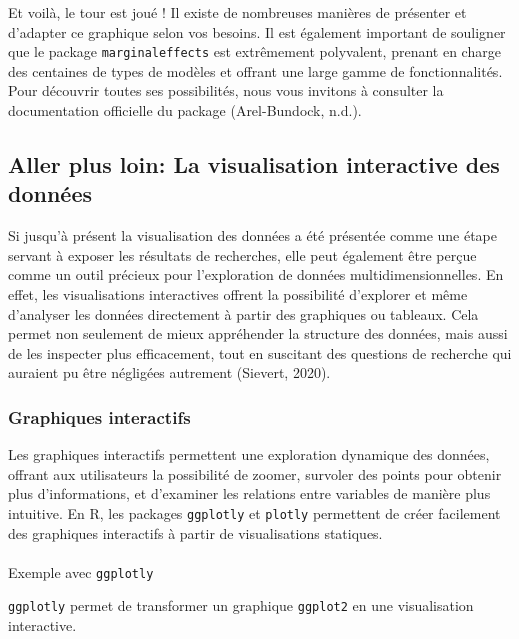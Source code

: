 \documentclass[
  letterpaper,
  DIV=11,
  numbers=noendperiod]{scrreprt}
\makeatletter
\let\oldparagraph\paragraph
\renewcommand{\paragraph}{
    \@ifstar
      \xxxParagraphStar
      \xxxParagraphNoStar
  }
\newcommand{\xxxParagraphStar}[1]{\oldparagraph*{#1}\mbox{}}
\newcommand{\xxxParagraphNoStar}[1]{\oldparagraph{#1}\mbox{}}
\makeatother
\begin{document}
Et voilà, le tour est joué ! Il existe de nombreuses manières de
présenter et d'adapter ce graphique selon vos besoins. Il est également
important de souligner que le package \texttt{marginaleffects} est
extrêmement polyvalent, prenant en charge des centaines de types de
modèles et offrant une large gamme de fonctionnalités. Pour découvrir
toutes ses possibilités, nous vous invitons à consulter la documentation
officielle du package (Arel-Bundock, n.d.).

\subsection{Aller plus loin: La visualisation interactive des
données}\label{aller-plus-loin-la-visualisation-interactive-des-donnuxe9es}

Si jusqu'à présent la visualisation des données a été présentée comme
une étape servant à exposer les résultats de recherches, elle peut
également être perçue comme un outil précieux pour l'exploration de
données multidimensionnelles. En effet, les visualisations interactives
offrent la possibilité d'explorer et même d'analyser les données
directement à partir des graphiques ou tableaux. Cela permet non
seulement de mieux appréhender la structure des données, mais aussi de
les inspecter plus efficacement, tout en suscitant des questions de
recherche qui auraient pu être négligées autrement (Sievert, 2020).

\subsubsection{Graphiques interactifs}\label{graphiques-interactifs}

Les graphiques interactifs permettent une exploration dynamique des
données, offrant aux utilisateurs la possibilité de zoomer, survoler des
points pour obtenir plus d'informations, et d'examiner les relations
entre variables de manière plus intuitive. En R, les packages
\texttt{ggplotly} et \texttt{plotly} permettent de créer facilement des
graphiques interactifs à partir de visualisations statiques.

\paragraph{\texorpdfstring{Exemple avec
\texttt{ggplotly}}{Exemple avec ggplotly}}\label{exemple-avec-ggplotly}

\texttt{ggplotly} permet de transformer un graphique \texttt{ggplot2} en
une visualisation interactive.
\end{document}
